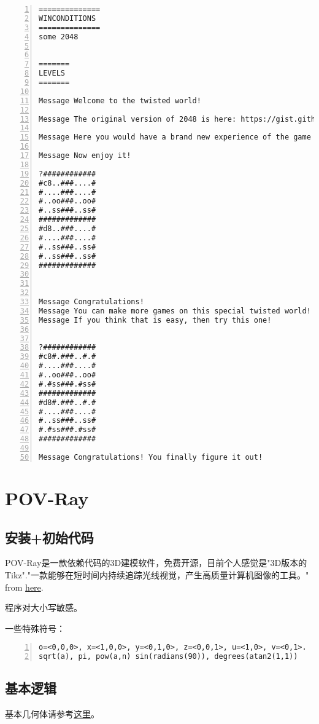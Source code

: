 \documentclass[11pt]{amsart}
\begin{document}
\begin{lstlisting}[numbers=left,numberstyle=\tiny,numbersep=10pt]
==============
WINCONDITIONS
==============
some 2048


=======
LEVELS
=======

Message Welcome to the twisted world!

Message The original version of 2048 is here: https://gist.github.com/tinjoonatan/ada1f82d7a51bad137083c4133ad4fc2

Message Here you would have a brand new experience of the game 2048. It's simpler since there are more spaces for you to move.

Message Now enjoy it!

?############
#c8..###....#
#....###....#
#..oo###..oo#
#..ss###..ss#
#############
#d8..###....#
#....###....#
#..ss###..ss#
#..ss###..ss#
#############



Message Congratulations!
Message You can make more games on this special twisted world! It's a special Riemann surface with constant zero curvature.
Message If you think that is easy, then try this one!


?############
#c8#.###..#.#
#....###....#
#..oo###..oo#
#.#ss###.#ss#
#############
#d8#.###..#.#
#....###....#
#..ss###..ss#
#.#ss###.#ss#
#############

Message Congratulations! You finally figure it out!

\end{lstlisting}
\section{POV-Ray}
\subsection{安装+初始代码}
POV-Ray是一款依赖代码的3D建模软件，免费开源，目前个人感觉是"3D版本的Tikz"."一款能够在短时间内持续追踪光线视觉，产生高质量计算机图像的工具。" from \href{https://blog.csdn.net/zhr_hadoop/article/details/51289804}{here}.

程序对大小写敏感。

一些特殊符号：
\begin{lstlisting}[numbers=left,numberstyle=\tiny,numbersep=10pt]
o=<0,0,0>, x=<1,0,0>, y=<0,1,0>, z=<0,0,1>, u=<1,0>, v=<0,1>.
sqrt(a), pi, pow(a,n) sin(radians(90)), degrees(atan2(1,1))
\end{lstlisting}
\subsection{基本逻辑}
基本几何体请参考\href{http://www.f-lohmueller.de/pov_tut/all_shapes/shapes000e.htm}{这里}。
\end{document}
